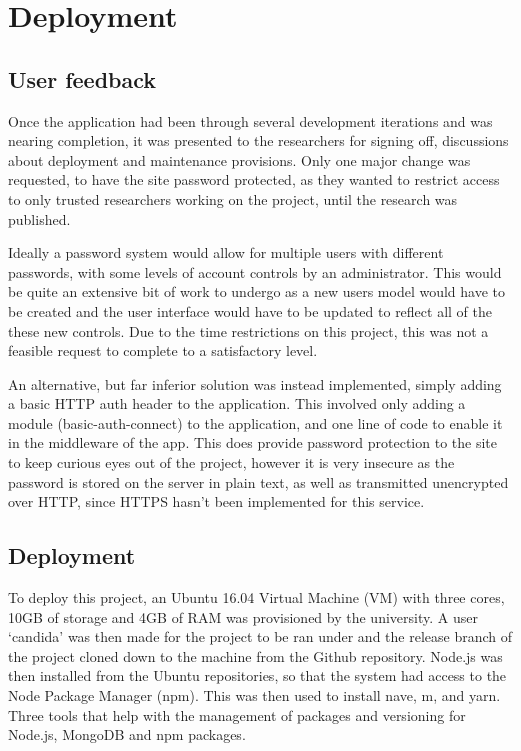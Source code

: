 \chapter{Deployment}


\section{User feedback}
Once the application had been through several development iterations and was nearing completion, it was presented to the researchers for signing off, discussions about deployment and maintenance provisions. Only one major change was requested, to have the site password protected, as they wanted to restrict access to only trusted researchers working on the project, until the research was published.

Ideally a password system would allow for multiple users with different passwords, with some levels of account controls by an administrator. This would be quite an extensive bit of work to undergo as a new users model would have to be created and the user interface would have to be updated to reflect all of the these new controls. Due to the time restrictions on this project, this was not a feasible request to complete to a satisfactory level.

An alternative, but far inferior solution was instead implemented, simply adding a basic HTTP auth header to the application. This involved only adding a module (basic-auth-connect) to the application, and one line of code to enable it in the middleware of the app. This does provide password protection to the site to keep curious eyes out of the project, however it is very insecure as the password is stored on the server in plain text, as well as transmitted unencrypted over HTTP, since HTTPS hasn't been implemented for this service. 

\section{Deployment}
To deploy this project, an Ubuntu 16.04 Virtual Machine (VM) with three cores, 10GB of storage and 4GB of RAM was provisioned by the university. A user `candida' was then made for the project to be ran under and the release branch of the project cloned down to the machine from the Github repository. Node.js was then installed from the Ubuntu repositories, so that the system had access to the Node Package Manager (npm). This was then used to install nave\cite{nave}, m\cite{m}, and yarn\cite{yarn}. Three tools that help with the management of packages and versioning for Node.js, MongoDB and npm packages.

